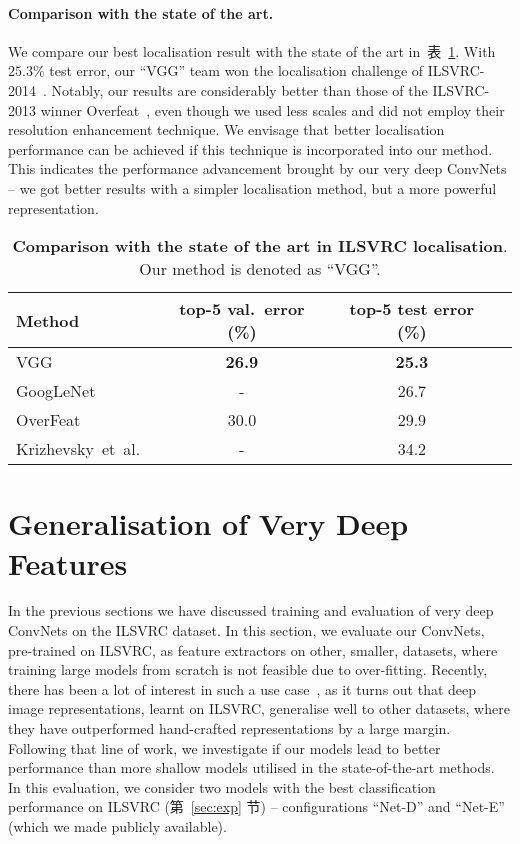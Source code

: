 \documentclass{article} %
\makeatletter
\newcommand{\tblref}[1]{表~\ref{#1}}
\newcommand{\sref}[1]{第~\ref{#1} 节}
\newcommand*{\etal}{et~al.\@\xspace}
\makeatother
\begin{document}
\paragraph{Comparison with the state of the art.}

We compare our best localisation result with the state of the art in~\tblref{tab:loc_SOA}.
With $25.3\%$ test error, our ``VGG'' team won the localisation challenge of ILSVRC-2014~\citep{Russakovsky14}.
Notably, our results are considerably better than those of the ILSVRC-2013 winner Overfeat~\citep{Sermanet14}, even though we used less scales and did not employ
their resolution enhancement technique. 
We envisage that better localisation performance can be achieved if this technique is incorporated into our method.
This indicates the performance advancement brought by our very deep ConvNets -- we got better results with a simpler localisation method, but a more powerful representation.

\begin{table}[htb]
\setlength{\tabcolsep}{2pt}
\small
\centering
\caption{\textbf{Comparison with the state of the art in ILSVRC localisation}. Our method is denoted as ``VGG''.
}
\begin{tabular}{|l|c|c|c|} \hline
Method & top-5 val.\ error (\%) & top-5 test error (\%) \\ \hline
VGG & \textbf{26.9} & \textbf{25.3} \\ \hline
GoogLeNet~\citep{Szegedy14} & - & 26.7 \\ \hline
OverFeat~\citep{Sermanet14} & 30.0 & 29.9 \\ \hline
Krizhevsky~\etal~\citep{Krizhevsky12} & - & 34.2 \\ \hline
\end{tabular}
\label{tab:loc_SOA}
\end{table}

\section{Generalisation of Very Deep Features}
\label{sec:dataset_transfer}
In the previous sections we have discussed training and evaluation of very deep ConvNets on the ILSVRC dataset. In this section, we evaluate our ConvNets, pre-trained on ILSVRC, as feature extractors on other, smaller, datasets, where training large models from scratch is not feasible due to over-fitting. Recently, there has been a lot of interest in such a use case~\citep{Zeiler13,Donahue13,Razavian14,Chatfield14}, as it turns out that deep image representations, learnt on ILSVRC, generalise well to other datasets, where they have outperformed hand-crafted representations by a large margin. Following that line of work, we investigate if our models lead to better performance than more shallow models utilised in the state-of-the-art methods.
In this evaluation, we consider two models with the best classification performance on ILSVRC (\sref{sec:exp}) -- configurations ``Net-D'' and ``Net-E'' (which we made publicly available).
\end{document}
